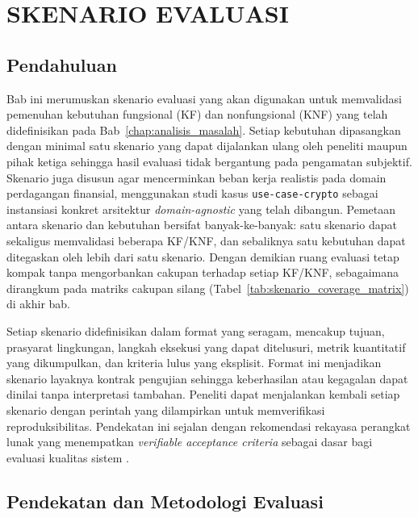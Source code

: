 \chapter{SKENARIO EVALUASI}
\label{chap:skenario_evaluasi}

\section{Pendahuluan}

Bab ini merumuskan skenario evaluasi yang akan digunakan untuk memvalidasi pemenuhan kebutuhan fungsional (KF) dan nonfungsional (KNF) yang telah didefinisikan pada Bab~\ref{chap:analisis_masalah}. Setiap kebutuhan dipasangkan dengan minimal satu skenario yang dapat dijalankan ulang oleh peneliti maupun pihak ketiga sehingga hasil evaluasi tidak bergantung pada pengamatan subjektif. Skenario juga disusun agar mencerminkan beban kerja realistis pada domain perdagangan finansial, menggunakan studi kasus \texttt{use-case-crypto} sebagai instansiasi konkret arsitektur \textit{domain-agnostic} yang telah dibangun. Pemetaan antara skenario dan kebutuhan bersifat banyak-ke-banyak: satu skenario dapat sekaligus memvalidasi beberapa KF/KNF, dan sebaliknya satu kebutuhan dapat ditegaskan oleh lebih dari satu skenario. Dengan demikian ruang evaluasi tetap kompak tanpa mengorbankan cakupan terhadap setiap KF/KNF, sebagaimana dirangkum pada matriks cakupan silang (Tabel~\ref{tab:skenario_coverage_matrix}) di akhir bab.

Setiap skenario didefinisikan dalam format yang seragam, mencakup tujuan, prasyarat lingkungan, langkah eksekusi yang dapat ditelusuri, metrik kuantitatif yang dikumpulkan, dan kriteria lulus yang eksplisit. Format ini menjadikan skenario layaknya kontrak pengujian sehingga keberhasilan atau kegagalan dapat dinilai tanpa interpretasi tambahan. Peneliti dapat menjalankan kembali setiap skenario dengan perintah yang dilampirkan untuk memverifikasi reproduksibilitas. Pendekatan ini sejalan dengan rekomendasi rekayasa perangkat lunak yang menempatkan \textit{verifiable acceptance criteria} sebagai dasar bagi evaluasi kualitas sistem \autocite{sommerville2016software,lamsweerde2009requirements}.

\section{Pendekatan dan Metodologi Evaluasi}

